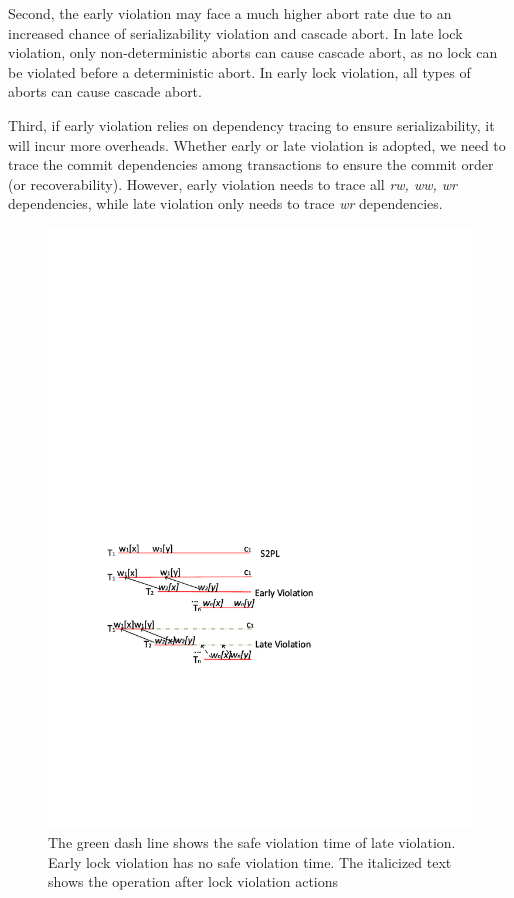 \documentclass[conference]{IEEEtran}
\begin{document}
Second, the early violation may face a much higher abort rate due to an increased chance of serializability violation and cascade abort.
In late lock violation, only non-deterministic aborts can cause cascade abort, as no lock can be violated before a deterministic abort.
In early lock violation, all types of aborts can cause cascade abort.

Third, if early violation relies on dependency tracing to ensure serializability, it will incur more overheads.
Whether early or late violation is adopted, we need to trace the commit dependencies among transactions to ensure the commit order (or recoverability).
However, early violation needs to trace all \emph{rw, ww, wr} dependencies, while late violation only needs to trace \emph{wr} dependencies.


\begin{figure}[tbp]
  \centerline{\includegraphics[scale=0.6]{lock_violation_safe.pdf}}
  \caption
  {The green dash line shows the safe violation time of late violation.
  Early lock violation has no safe violation time.
  The italicized text shows the operation after lock violation actions}
\label{fig:lock_violation_safe}
\end{figure}
\end{document}
